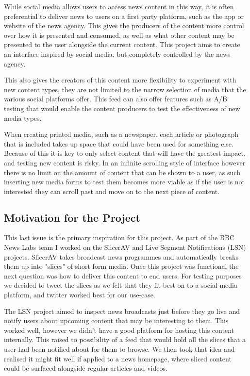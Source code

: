 \documentclass[12pt,titlepage]{article}
\begin{document}
  While social media allows users to access news content in this way, it is
  often preferential to deliver news to users on a first party platform, such as
  the app or website of the news agency. This gives the producers of the content
  more control over how it is presented and consumed, as well as what other
  content may be presented to the user alongside the current content. This
  project aims to create an interface inspired by social media, but completely
  controlled by the news agency.

  This also gives the creators of this content more flexibility to experiment
  with new content types, they are not limited to the narrow selection of media
  that the various social platforms offer. This feed can also offer features
  such as A/B testing that would enable the content producers to test the
  effectiveness of new media types.

  When creating printed media, such as a newspaper, each article or photograph
  that is included takes up space that could have been used for something else.
  Because of this it is key to only select content that will have the greatest
  impact, and testing new content is risky. In an infinite scrolling style of
  interface however there is no limit on the amount of content that can be shown
  to a user, as such inserting new media forms to test them becomes more viable
  as if the user is not interested they can scroll past and move on to the next
  piece of content.

  \subsection{Motivation for the Project}

  This last issue is the primary inspiration for this project. As part of the
  BBC News Labs team I worked on the SlicerAV and Live Segment Notifications
  (LSN) projects. SlicerAV takes broadcast news programmes and
  automatically breaks them up into "slices" of short form media. Once this
  project was functional the next question was how to deliver this content to
  end users. For testing purposes we decided to tweet the slices as we felt that
  they fit best on to a social media platform, and twitter worked best for our
  use-case.

  The LSN project aimed to inspect news broadcasts just before they go live and
  notify users about upcoming content that may be interesting to them. This
  worked well, however we didn't have a good platform for hosting this content
  internally. This raised to possibility of a feed that would hold all the
  slices that a user had been notified about for them to browse. We then took
  that idea and realised it might fit well if applied to a news homepage, where
  sliced content could be surfaced alongside regular articles and videos.
\end{document}

